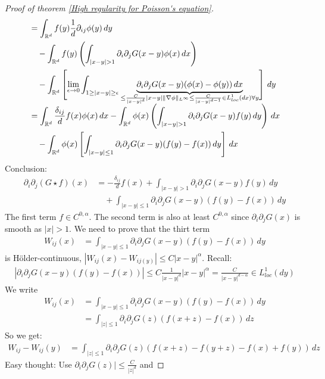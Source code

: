 \documentclass{report}
\theoremstyle{tommy}
\begin{document}
\begin{proof}[Proof of theorem \ref{High regularity for Poisson's equation}]
\begin{align*}
      &= \int_{\mathbb{R}^d} f(y) \frac{1}{d} \partial_{ij} \phi(y) \, dy \\
      & \quad - \int_{\mathbb{R}^d} f(y) \left(\int_{|x-y| > 1} \partial_i \partial_j G(x-y) \phi(x) \, dx\right) \\
      & \quad - \int_{\mathbb{R}^d} \left[\lim_{\epsilon \to 0} \int_{1 \ge |x-y| \ge \epsilon} \underbrace{\partial_i \partial_j G(x-y) (\phi(x) - \phi(y)) \, dx}_{\smash{\le \frac{C}{|x-y|^d}|x-y| \|\nabla \phi\|_{L^\infty} \le \frac{C}{|x-y|^{d-1}} \in L_{loc}^1(dx) \forall y}}\right] \, dy \\
      &= \int_{\mathbb{R}^d} \frac{\delta_{ij}}{d} f(x) \phi(x) \, dx
      - \int_{\mathbb{R}^d} \phi(x) \left(\int_{|x-y| > 1} \partial_i \partial_j G(x-y) f(y) \, dy\right) \, dx \\
      & \quad - \int_{\mathbb{R}^d} \phi(x) \left[\int_{|x-y| \le 1} \partial_i \partial_j G(x-y) (f(y)-f(x))\, dy\right] \, dx
    \end{align*}
    Conclusion: 
    \begin{align*}
      \partial_i \partial_j (G \star f) (x) &= - \frac{\delta_{ij}}{d} f(x) + \int_{|x-y| > 1} \partial_i \partial_j G(x-y) f(y) \, dy \\
      &\quad + \int_{|x-y| \le 1} \partial_i \partial_j G(x-y) \left(f(y) - f(x)\right) \, dy
    \end{align*}
    The first term \(f \in C^{0, \alpha}\). The second term is also at least \(C^{0, \alpha}\) since \(\partial_i \partial_j G(x)\) is smooth as \(|x| > 1\). We need to prove that the thirt term
    \begin{align*}
      W_{ij}(x) &= \int_{|x-y| \le 1} \partial_i \partial_j G(x-y)(f(y) - f(x)) \, dy
    \end{align*}
    is Hölder-continuous, \(|W_{ij}(x) - W_{ij(y)}| \le C |x-y|^\alpha\). Recall:
    \begin{align*}
      |\partial_i \partial_j G(x-y) (f(y)-f(x))| \le C \frac{1}{|x-y|^d}|x-y|^\alpha = \frac{C}{|x-y|^{d-\alpha}} \in L_{loc}^1(dy)
    \end{align*}
    We write 
    \begin{align*}
      W_{ij}(x) 
      &= \int_{|x-y| \le 1} \partial_i \partial_j G(x-y) (f(y)-f(x)) \, dy \\
      &= \int_{|z| \le 1} \partial_i \partial_j G(z) (f(x+z)-f(x)) \, dz
    \end{align*}
    So we get: \begin{align*}
      W_{ij} - W_{ij}(y) &= \int_{|z| \le 1} \partial_i \partial_j G(z) (f(x+z)-f(y+z)-f(x)+f(y)) \, dz
    \end{align*}
    Easy thought: Use \(\partial_i \partial_j G(z)| \le \frac{C}{|z|^d}\) and 
    

\end{proof}
\end{document}
